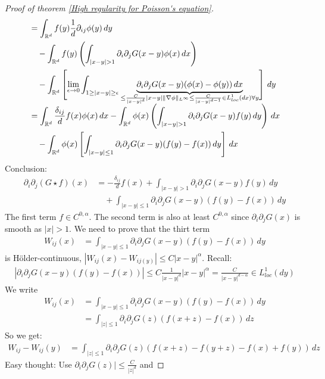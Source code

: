 \documentclass{report}
\theoremstyle{tommy}
\begin{document}
\begin{proof}[Proof of theorem \ref{High regularity for Poisson's equation}]
\begin{align*}
      &= \int_{\mathbb{R}^d} f(y) \frac{1}{d} \partial_{ij} \phi(y) \, dy \\
      & \quad - \int_{\mathbb{R}^d} f(y) \left(\int_{|x-y| > 1} \partial_i \partial_j G(x-y) \phi(x) \, dx\right) \\
      & \quad - \int_{\mathbb{R}^d} \left[\lim_{\epsilon \to 0} \int_{1 \ge |x-y| \ge \epsilon} \underbrace{\partial_i \partial_j G(x-y) (\phi(x) - \phi(y)) \, dx}_{\smash{\le \frac{C}{|x-y|^d}|x-y| \|\nabla \phi\|_{L^\infty} \le \frac{C}{|x-y|^{d-1}} \in L_{loc}^1(dx) \forall y}}\right] \, dy \\
      &= \int_{\mathbb{R}^d} \frac{\delta_{ij}}{d} f(x) \phi(x) \, dx
      - \int_{\mathbb{R}^d} \phi(x) \left(\int_{|x-y| > 1} \partial_i \partial_j G(x-y) f(y) \, dy\right) \, dx \\
      & \quad - \int_{\mathbb{R}^d} \phi(x) \left[\int_{|x-y| \le 1} \partial_i \partial_j G(x-y) (f(y)-f(x))\, dy\right] \, dx
    \end{align*}
    Conclusion: 
    \begin{align*}
      \partial_i \partial_j (G \star f) (x) &= - \frac{\delta_{ij}}{d} f(x) + \int_{|x-y| > 1} \partial_i \partial_j G(x-y) f(y) \, dy \\
      &\quad + \int_{|x-y| \le 1} \partial_i \partial_j G(x-y) \left(f(y) - f(x)\right) \, dy
    \end{align*}
    The first term \(f \in C^{0, \alpha}\). The second term is also at least \(C^{0, \alpha}\) since \(\partial_i \partial_j G(x)\) is smooth as \(|x| > 1\). We need to prove that the thirt term
    \begin{align*}
      W_{ij}(x) &= \int_{|x-y| \le 1} \partial_i \partial_j G(x-y)(f(y) - f(x)) \, dy
    \end{align*}
    is Hölder-continuous, \(|W_{ij}(x) - W_{ij(y)}| \le C |x-y|^\alpha\). Recall:
    \begin{align*}
      |\partial_i \partial_j G(x-y) (f(y)-f(x))| \le C \frac{1}{|x-y|^d}|x-y|^\alpha = \frac{C}{|x-y|^{d-\alpha}} \in L_{loc}^1(dy)
    \end{align*}
    We write 
    \begin{align*}
      W_{ij}(x) 
      &= \int_{|x-y| \le 1} \partial_i \partial_j G(x-y) (f(y)-f(x)) \, dy \\
      &= \int_{|z| \le 1} \partial_i \partial_j G(z) (f(x+z)-f(x)) \, dz
    \end{align*}
    So we get: \begin{align*}
      W_{ij} - W_{ij}(y) &= \int_{|z| \le 1} \partial_i \partial_j G(z) (f(x+z)-f(y+z)-f(x)+f(y)) \, dz
    \end{align*}
    Easy thought: Use \(\partial_i \partial_j G(z)| \le \frac{C}{|z|^d}\) and 
    

\end{proof}
\end{document}
